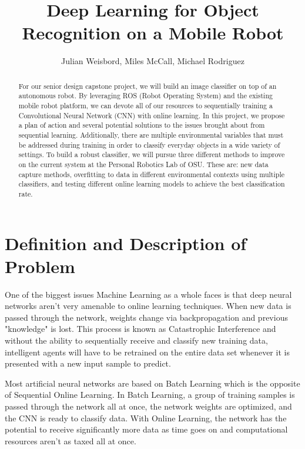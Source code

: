 \documentclass[a4paper, 10pt]{article}
\title{Deep Learning for Object Recognition on a Mobile Robot}
\author{Julian Weisbord, Miles McCall, Michael Rodriguez}
\begin{document}
\maketitle

\begin{abstract}
\newline
For our senior design capstone project, we will build an image classifier on top of an autonomous robot. By leveraging ROS (Robot Operating System)  and the existing mobile robot platform, we can devote all of our resources to sequentially training a Convolutional Neural Network (CNN) with online learning. In this project, we propose a plan of action and several potential solutions to the issues brought about from sequential learning. Additionally, there are multiple environmental variables that must be addressed during training in order to classify everyday objects in a wide variety of settings. To build a robust classifier, we will pursue three different methods to improve on the current system at the Personal Robotics Lab of OSU. These are: new data capture methods, overfitting to data in different environmental contexts using multiple classifiers, and testing different online learning models to achieve the best classification rate.
\end{abstract}

\newpage

\section{Definition and Description of Problem}

One of the biggest issues Machine Learning as a whole faces is that deep neural networks aren't very amenable to online learning techniques. When new data is passed through the network, weights change via backpropagation and previous "knowledge" is lost. This process is known as Catastrophic Interference and without the ability to sequentially receive and classify new training data, intelligent agents will have to be retrained on the entire data set whenever it is presented with a new input sample to predict. 
	
Most artificial neural networks are based on Batch Learning which is the opposite of Sequential Online Learning. In Batch Learning, a group of training samples is passed through the network all at once, the network weights are optimized, and the CNN is ready to classify data. With Online Learning,  the network has the potential to receive significantly more data as time goes on and computational resources aren't as taxed all at once.
	
\end{document}
